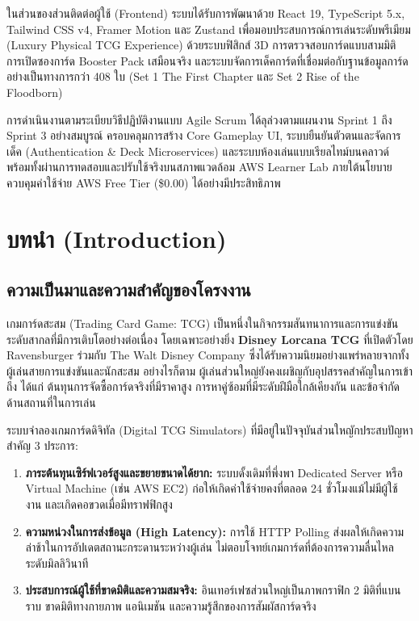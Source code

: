 \documentclass[12pt,a4paper]{article}
\begin{document}
ในส่วนของส่วนติดต่อผู้ใช้ (Frontend) ระบบได้รับการพัฒนาด้วย React 19, TypeScript 5.x, Tailwind CSS v4, Framer Motion และ Zustand เพื่อมอบประสบการณ์การเล่นระดับพรีเมียม (Luxury Physical TCG Experience) ด้วยระบบฟิสิกส์ 3D การตรวจสอบการ์ดแบบสามมิติ การเปิดซองการ์ด Booster Pack เสมือนจริง และระบบจัดการเด็คการ์ดที่เชื่อมต่อกับฐานข้อมูลการ์ดอย่างเป็นทางการกว่า 408 ใบ (Set 1 The First Chapter และ Set 2 Rise of the Floodborn)

การดำเนินงานตามระเบียบวิธีปฏิบัติงานแบบ Agile Scrum ได้ลุล่วงตามแผนงาน Sprint 1 ถึง Sprint 3 อย่างสมบูรณ์ ครอบคลุมการสร้าง Core Gameplay UI, ระบบยืนยันตัวตนและจัดการเด็ค (Authentication \& Deck Microservices) และระบบห้องเล่นแบบเรียลไทม์บนคลาวด์ พร้อมทั้งผ่านการทดสอบและปรับใช้จริงบนสภาพแวดล้อม AWS Learner Lab ภายใต้นโยบายควบคุมค่าใช้จ่าย AWS Free Tier (\$0.00) ได้อย่างมีประสิทธิภาพ

\newpage

\section{บทนำ (Introduction)}

\subsection{ความเป็นมาและความสำคัญของโครงงาน}
เกมการ์ดสะสม (Trading Card Game: TCG) เป็นหนึ่งในกิจกรรมสันทนาการและการแข่งขันระดับสากลที่มีการเติบโตอย่างต่อเนื่อง โดยเฉพาะอย่างยิ่ง \textbf{Disney Lorcana TCG} ที่เปิดตัวโดย Ravensburger ร่วมกับ The Walt Disney Company ซึ่งได้รับความนิยมอย่างแพร่หลายจากทั้งผู้เล่นสายการแข่งขันและนักสะสม อย่างไรก็ตาม ผู้เล่นส่วนใหญ่ยังคงเผชิญกับอุปสรรคสำคัญในการเข้าถึง ได้แก่ ต้นทุนการจัดซื้อการ์ดจริงที่มีราคาสูง การหาคู่ซ้อมที่มีระดับฝีมือใกล้เคียงกัน และข้อจำกัดด้านสถานที่ในการเล่น

ระบบจำลองเกมการ์ดดิจิทัล (Digital TCG Simulators) ที่มีอยู่ในปัจจุบันส่วนใหญักประสบปัญหาสำคัญ 3 ประการ:
\begin{enumerate}[leftmargin=1.5em, itemsep=2pt]
  \item \textbf{ภาระต้นทุนเซิร์ฟเวอร์สูงและขยายขนาดได้ยาก:} ระบบดั้งเดิมที่พึ่งพา Dedicated Server หรือ Virtual Machine (เช่น AWS EC2) ก่อให้เกิดค่าใช้จ่ายคงที่ตลอด 24 ชั่วโมงแม้ไม่มีผู้ใช้งาน และเกิดคอขวดเมื่อมีทราฟฟิกสูง
  \item \textbf{ความหน่วงในการส่งข้อมูล (High Latency):} การใช้ HTTP Polling ส่งผลให้เกิดความล่าช้าในการอัปเดตสถานะกระดานระหว่างผู้เล่น ไม่ตอบโจทย์เกมการ์ดที่ต้องการความลื่นไหลระดับมิลลิวินาที
  \item \textbf{ประสบการณ์ผู้ใช้ที่ขาดมิติและความสมจริง:} อินเทอร์เฟซส่วนใหญ่เป็นภาพกราฟิก 2 มิติที่แบนราบ ขาดมิติทางกายภาพ แอนิเมชัน และความรู้สึกของการสัมผัสการ์ดจริง
\end{enumerate}
\end{document}
